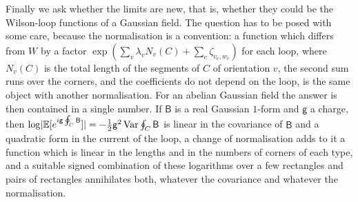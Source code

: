 \documentclass[11pt]{preprint}
\DeclarePairedDelimiter{\abs}{\lvert}{\rvert}
\numberwithin{equation}{section}
\theoremstyle{definition}
\theoremstyle{remark}
\theoremstyle{plain}
\begin{document}
Finally we ask whether the limits are new, that is, whether they could be the Wilson-loop functions of a Gaussian field. The question has to be posed with some care, because the normalisation is a convention: a function which differs from $W$ by a factor $\exp(\sum_v\lambda_vN_v(C) + \sum_c\zeta_{v_c,w_c})$ for each loop, where $N_v(C)$ is the total length of the segments of $C$ of orientation $v$, the second sum runs over the corners, and the coefficients do not depend on the loop, is the same object with another normalisation. For an abelian Gaussian field the answer is then contained in a single number. If $\mathsf B$ is a real Gaussian $1$-form and $\mathsf g$ a charge, then $\log\abs{\mathbb E[e^{i\mathsf g\oint_C\mathsf B}]} = -\frac12\mathsf g^2\operatorname{Var}\oint_C\mathsf B$ is linear in the covariance of $\mathsf B$ and a quadratic form in the current of the loop, a change of normalisation adds to it a function which is linear in the lengths and in the numbers of corners of each type, and a suitable signed combination of these logarithms over a few rectangles and pairs of rectangles annihilates both, whatever the covariance and whatever the normalisation.
\end{document}
